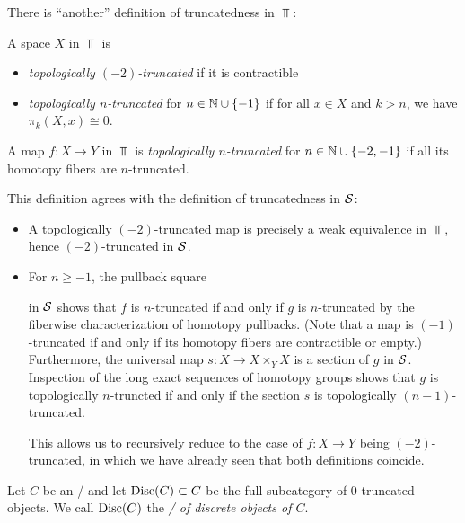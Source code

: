 \begin{remark}
    There is ``another'' definition of truncatedness in $\Top$:

    A space $X$ in $\Top$ is 
    \begin{itemize}
        \item \emph{topologically $(-2)$-truncated} if it is contractible 
        \item \emph{topologically $n$-truncated} for $n\in\mathbb{N}\cup\left\lbrace-1\right\rbrace$ if for all $x\in X$ and $k>n$, we have $\pi_k(X,x)\cong 0$.
    \end{itemize}
    A map $f\colon X\to Y$ in $\Top$ is \emph{topologically $n$-truncated} for $n\in\mathbb{N}\cup\left\lbrace-2,-1\right\rbrace$ if all its homotopy fibers are $n$-truncated.
    
    This definition agrees with the definition of truncatedness in $\mathcal{S}$:
    \begin{itemize}
        \item A topologically $(-2)$-truncated map is precisely a weak equivalence in $\Top$, hence $(-2)$-truncated in $\mathcal{S}$.
        \item For $n\geq -1$, the pullback square
        \begin{center}
        \end{center}
        in $\mathcal{S}$ shows that $f$ is $n$-truncated if and only if $g$ is $n$-truncated by the fiberwise characterization of homotopy pullbacks. %
        (Note that a map is $(-1)$-truncated if and only if its homotopy fibers are contractible or empty.)
        Furthermore, the universal map $s\colon X\to X\times_Y X$ is a section of $g$ in $\mathcal{S}$.
        Inspection of the long exact sequences of homotopy groups shows that $g$ is topologically $n$-truncted if and only if the section $s$ is topologically $(n-1)$-truncated.

        This allows us to recursively reduce to the case of $f\colon X\to Y$ being $(-2)$-truncated, in which we have already seen that both definitions coincide.
    \end{itemize}
\end{remark}
\begin{definition}
    Let $C$ be an \inftytop/ and let $\operatorname{Disc}(C)\subset C$ be the full subcategory of $0$-truncated objects.
    We call $\operatorname{Disc}(C)$ the \emph{\inftycat/ of discrete objects of $C$}.
\end{definition}
